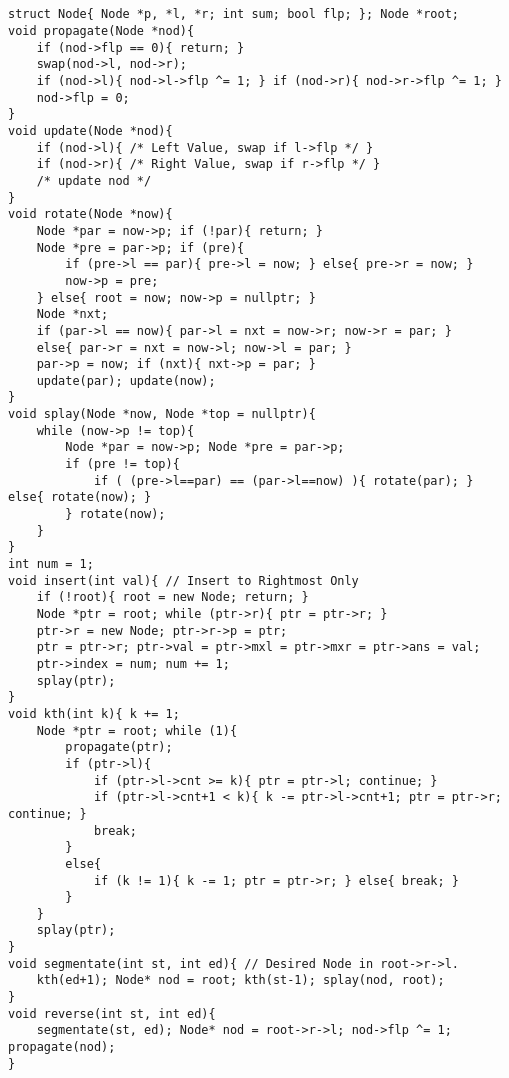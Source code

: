 \documentclass[landscape, 8pt, a4paper, oneside, twocolumn]{extarticle}
\begin{document}
\subsection{}
\begin{verbatim}
struct Node{ Node *p, *l, *r; int sum; bool flp; }; Node *root;
void propagate(Node *nod){
    if (nod->flp == 0){ return; }
    swap(nod->l, nod->r);
    if (nod->l){ nod->l->flp ^= 1; } if (nod->r){ nod->r->flp ^= 1; }
    nod->flp = 0;
}
void update(Node *nod){
    if (nod->l){ /* Left Value, swap if l->flp */ }
    if (nod->r){ /* Right Value, swap if r->flp */ }
    /* update nod */
}
void rotate(Node *now){
    Node *par = now->p; if (!par){ return; }
    Node *pre = par->p; if (pre){
        if (pre->l == par){ pre->l = now; } else{ pre->r = now; }
        now->p = pre;
    } else{ root = now; now->p = nullptr; }
    Node *nxt;
    if (par->l == now){ par->l = nxt = now->r; now->r = par; }
    else{ par->r = nxt = now->l; now->l = par; }
    par->p = now; if (nxt){ nxt->p = par; }
    update(par); update(now);
}
void splay(Node *now, Node *top = nullptr){
    while (now->p != top){
        Node *par = now->p; Node *pre = par->p;
        if (pre != top){
            if ( (pre->l==par) == (par->l==now) ){ rotate(par); } else{ rotate(now); }
        } rotate(now);
    }
}
int num = 1;
void insert(int val){ // Insert to Rightmost Only
    if (!root){ root = new Node; return; }
    Node *ptr = root; while (ptr->r){ ptr = ptr->r; }
    ptr->r = new Node; ptr->r->p = ptr;
    ptr = ptr->r; ptr->val = ptr->mxl = ptr->mxr = ptr->ans = val;
    ptr->index = num; num += 1;
    splay(ptr);
}
void kth(int k){ k += 1;
    Node *ptr = root; while (1){
        propagate(ptr);
        if (ptr->l){
            if (ptr->l->cnt >= k){ ptr = ptr->l; continue; }
            if (ptr->l->cnt+1 < k){ k -= ptr->l->cnt+1; ptr = ptr->r; continue; }
            break;
        }
        else{
            if (k != 1){ k -= 1; ptr = ptr->r; } else{ break; }
        }
    }
    splay(ptr);
}
void segmentate(int st, int ed){ // Desired Node in root->r->l.
    kth(ed+1); Node* nod = root; kth(st-1); splay(nod, root);
}
void reverse(int st, int ed){
    segmentate(st, ed); Node* nod = root->r->l; nod->flp ^= 1; propagate(nod);
}
\end{verbatim}
\end{document}
